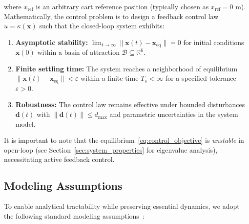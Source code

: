 where $x_{\text{ref}}$ is an arbitrary cart reference position (typically chosen as $x_{\text{ref}} = 0$ m). Mathematically, the control problem is to design a feedback control law $u = \kappa(\mathbf{x})$ such that the closed-loop system exhibits:

\begin{enumerate}
\item \textbf{Asymptotic stability:} $\lim_{t \to \infty} \|\mathbf{x}(t) - \mathbf{x}_{\text{eq}}\| = 0$ for initial conditions $\mathbf{x}(0)$ within a basin of attraction $\mathcal{B} \subseteq \mathbb{R}^6$.

\item \textbf{Finite settling time:} The system reaches a neighborhood of equilibrium $\|\mathbf{x}(t) - \mathbf{x}_{\text{eq}}\| < \varepsilon$ within a finite time $T_s < \infty$ for a specified tolerance $\varepsilon > 0$.

\item \textbf{Robustness:} The control law remains effective under bounded disturbances $\mathbf{d}(t)$ with $\|\mathbf{d}(t)\| \leq d_{\max}$ and parametric uncertainties in the system model.
\end{enumerate}

It is important to note that the equilibrium~\eqref{eq:control_objective} is \textit{unstable} in open-loop (see Section~\ref{sec:system_properties} for eigenvalue analysis), necessitating active feedback control.

\subsection{Modeling Assumptions}

To enable analytical tractability while preserving essential dynamics, we adopt the following standard modeling assumptions~\cite{khalil2002nonlinear}:


